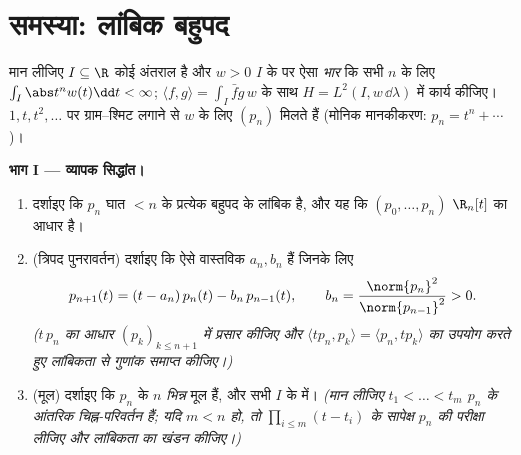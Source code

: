 \section{समस्या: लांबिक बहुपद}

\begin{problem}\label{pb:b3:hilbert:1}
मान लीजिए $I \subseteq \R$ कोई अंतराल है और $w > 0$ $I$ के  पर ऐसा
 \emph{भार} कि सभी $n$ के लिए $\int_I
\abs t^nw(t)\dd t < \infty$; $\langle f, g\rangle = \int_I \bar
fg\,w$ के साथ $H = L^2(I,
w\,\dd\lambda)$ में
कार्य कीजिए। $1, t, t^2, \dots$ पर ग्राम--श्मिट लगाने से $w$ के लिए
\emph{} $(p_n)$ मिलते हैं (मोनिक मानकीकरण:
$p_n = t^n + \cdots$)।

\medskip
\noindent\textbf{भाग I --- व्यापक सिद्धांत।}
\begin{enumerate}
  \item दर्शाइए कि $p_n$ घात $< n$ के प्रत्येक बहुपद के लांबिक
        है, और यह कि $(p_0, \dots, p_n)$ $\R_n[t]$ का आधार है।
  \item (त्रिपद पुनरावर्तन) दर्शाइए कि ऐसे वास्तविक $a_n,
        b_n$ हैं
        जिनके लिए
        \[
        p_{n+1}(t) = (t - a_n)\,p_n(t) - b_n\,p_{n-1}(t),
        \qquad b_n = \frac{\norm{p_n}^2}{\norm{p_{n-1}}^2} >
        0 .
        \]
        \emph{($t\,p_n$ का आधार $(p_k)_{k \leq
        n+1}$ में प्रसार कीजिए और $\langle tp_n, p_k\rangle = \langle p_n,
        tp_k\rangle$ का
        उपयोग करते हुए लांबिकता से गुणांक समाप्त कीजिए।)}
  \item (मूल) दर्शाइए कि $p_n$ के $n$ \emph{भिन्न} मूल हैं, और
        सभी $I$ के  में। \emph{(मान लीजिए $t_1 < \dots < t_m$ $p_n$ के
        आंतरिक चिह्न-परिवर्तन हैं; यदि $m < n$ हो, तो $\prod_{i\leq m}(t - t_i)$ के
        सापेक्ष $p_n$ की परीक्षा लीजिए और लांबिकता का खंडन
        कीजिए।)}
\end{enumerate}


\end{problem}
